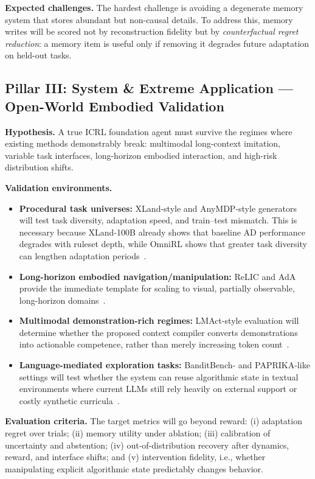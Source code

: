 \documentclass[10pt,twocolumn,letterpaper]{article}
\begin{document}
\textbf{Expected challenges.} The hardest challenge is avoiding a degenerate memory system that stores abundant but non-causal details. To address this, memory writes will be scored not by reconstruction fidelity but by \emph{counterfactual regret reduction}: a memory item is useful only if removing it degrades future adaptation on held-out tasks.

\subsection{Pillar III: System \& Extreme Application --- Open-World Embodied Validation}
\textbf{Hypothesis.} A true ICRL foundation agent must survive the regimes where existing methods demonstrably break: multimodal long-context imitation, variable task interfaces, long-horizon embodied interaction, and high-risk distribution shifts.

\textbf{Validation environments.}
\begin{itemize}[leftmargin=1.2em]
\item \textbf{Procedural task universes:} XLand-style and AnyMDP-style generators will test task diversity, adaptation speed, and train--test mismatch. This is necessary because XLand-100B already shows that baseline AD performance degrades with ruleset depth, while OmniRL shows that greater task diversity can lengthen adaptation periods~\cite{nikulin2024xland100b,wang2025omnirl}.
\item \textbf{Long-horizon embodied navigation/manipulation:} ReLIC and AdA provide the immediate template for scaling to visual, partially observable, long-horizon domains~\cite{elawady2024relic,adaptive2023ada}.
\item \textbf{Multimodal demonstration-rich regimes:} LMAct-style evaluation will determine whether the proposed context compiler converts demonstrations into actionable competence, rather than merely increasing token count~\cite{ruoss2024lmact}.
\item \textbf{Language-mediated exploration tasks:} BanditBench- and PAPRIKA-like settings will test whether the system can reuse algorithmic state in textual environments where current LLMs still rely heavily on external support or costly synthetic curricula~\cite{nie2024evolve,tajwar2025paprika}.
\end{itemize}

\textbf{Evaluation criteria.}
The target metrics will go beyond reward: (i) adaptation regret over trials; (ii) memory utility under ablation; (iii) calibration of uncertainty and abstention; (iv) out-of-distribution recovery after dynamics, reward, and interface shifts; and (v) intervention fidelity, i.e., whether manipulating explicit algorithmic state predictably changes behavior.
\end{document}
